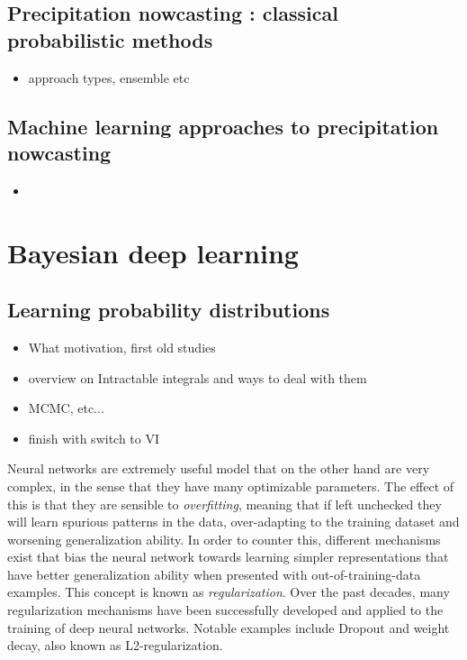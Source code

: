 \subsection{Precipitation nowcasting : classical probabilistic methods}
\begin{itemize}
	\item approach types, ensemble etc
\end{itemize}

\subsection{Machine learning approaches to precipitation nowcasting}
\begin{itemize}
	\item 
\end{itemize}

\section{Bayesian deep learning}

\subsection{Learning probability distributions}
\begin{itemize}
	\item What motivation, first old studies
	\item overview on Intractable integrals and ways to deal with them
	\item MCMC, etc...
	\item finish with switch to VI
\end{itemize}

	Neural networks are extremely useful model that on the other hand are very complex, in the sense that they have many optimizable parameters. The effect of this is that they are sensible to \textit{overfitting}, meaning that if left unchecked they will learn spurious patterns in the data, over-adapting to the training dataset and worsening generalization ability. In order to counter this, different mechanisms exist that bias the neural network towards learning simpler representations that have better generalization ability when presented with out-of-training-data examples. This concept is known as \textit{regularization}. Over the past decades, many regularization mechanisms have been successfully developed and applied to the training of deep neural networks. Notable examples include Dropout and weight decay, also known as L2-regularization.  
	
